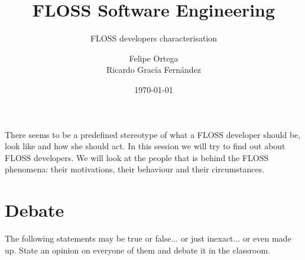 \documentclass[11pt]{scrartcl}
\title{\textbf{FLOSS Software Engineering}}
\subtitle{FLOSS developers characterisation}
\author{Felipe Ortega\\
		Ricardo Grac\'ia Fern\'andez}
\date{\today}
\begin{document}
\maketitle


There seems to be a predefined stereotype of what a FLOSS developer should be, look like and how she should act. In this session we will try to find out about FLOSS developers. We will look at the people that is behind the FLOSS phenomena: their motivations, their behaviour and their circumstances.

\section*{Debate}

The following statements may be true or false... or just inexact... or even made up. State an opinion on everyone of them and debate it in the classroom.
\end{document}

